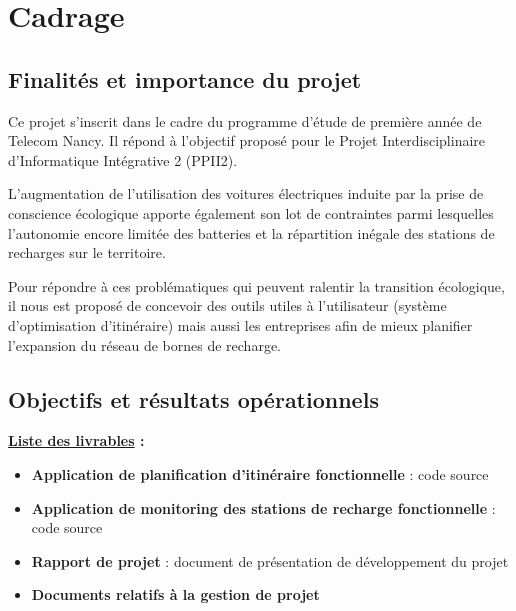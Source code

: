 \documentclass[12pt]{report}
\begin{document}
\section{Cadrage}
    \subsection{Finalités et importance du projet}
        Ce projet s’inscrit dans le cadre du programme d’étude de première année de Telecom
        Nancy. Il répond à l’objectif proposé pour le Projet Interdisciplinaire d’Informatique
        Intégrative 2 (PPII2).

        \bigskip
        L'augmentation de l'utilisation des voitures électriques induite par la prise de conscience écologique apporte également son lot de contraintes parmi lesquelles l'autonomie encore limitée des batteries et la répartition inégale des stations de recharges sur le territoire.

        \bigskip
        Pour répondre à ces problématiques qui peuvent ralentir la transition écologique, il nous est proposé de concevoir des outils utiles à l'utilisateur (système d'optimisation d'itinéraire) mais aussi les entreprises afin de mieux planifier l'expansion du réseau de bornes de recharge.

    \subsection{Objectifs et résultats opérationnels}
        \textbf{\underline{Liste des livrables} :}
        \begin{itemize}
            \item \textbf{Application de planification d'itinéraire fonctionnelle} : code source
            \item \textbf{Application de monitoring des stations de recharge fonctionnelle} : code source 
            \item \textbf{Rapport de projet} : document de présentation de développement du projet
            \item \textbf{Documents relatifs à la gestion de projet}
        \end{itemize}
\end{document}
